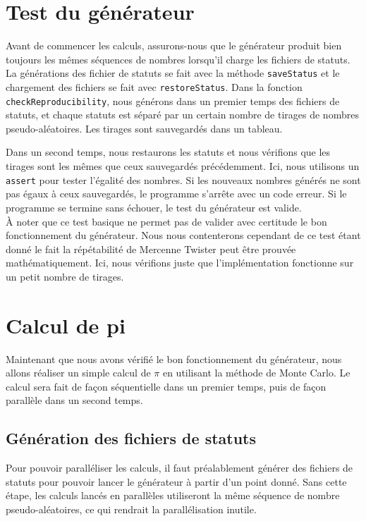 \documentclass[a4paper]{article}
\begin{document}
\section{Test du générateur}

Avant de commencer les calculs, assurons-nous que le générateur produit bien
toujours les mêmes séquences de nombres lorsqu'il charge les fichiers de
statuts.\\

La générations des fichier de statuts se fait avec la méthode
\texttt{saveStatus} et le chargement des fichiers se fait avec
\texttt{restoreStatus}. Dans la fonction \texttt{checkReproducibility},
nous générons dans un premier temps des fichiers de statuts, et chaque statuts
est séparé par un certain nombre de tirages de nombres pseudo-aléatoires. Les
tirages sont sauvegardés dans un tableau.

Dans un second temps, nous restaurons les statuts et nous vérifions que les
tirages sont les mêmes que ceux sauvegardés précédemment. Ici, nous utilisons un
\texttt{assert} pour tester l'égalité des nombres. Si les nouveaux nombres
générés ne sont pas égaux à ceux sauvegardés, le programme s'arrête avec un code
erreur. Si le programme se termine sans échouer, le test du générateur est
valide.\\

À noter que ce test basique ne permet pas de valider avec certitude le bon
fonctionnement du générateur. Nous nous contenterons cependant de ce test étant
donné le fait la répétabilité de Mercenne Twister peut être prouvée
mathématiquement. Ici, nous vérifions juste que l'implémentation fonctionne sur
un petit nombre de tirages.

\section{Calcul de pi}

Maintenant que nous avons vérifié le bon fonctionnement du générateur, nous
allons réaliser un simple calcul de $\pi$ en utilisant la méthode de Monte
Carlo. Le calcul sera fait de façon séquentielle dans un premier temps, puis de
façon parallèle dans un second temps.

\subsection{Génération des fichiers de statuts}

Pour pouvoir paralléliser les calculs, il faut préalablement générer des
fichiers de statuts pour pouvoir lancer le générateur à partir d'un point donné.
Sans cette étape, les calculs lancés en parallèles utiliseront la même séquence
de nombre pseudo-aléatoires, ce qui rendrait la parallélisation inutile.\\
\end{document}
